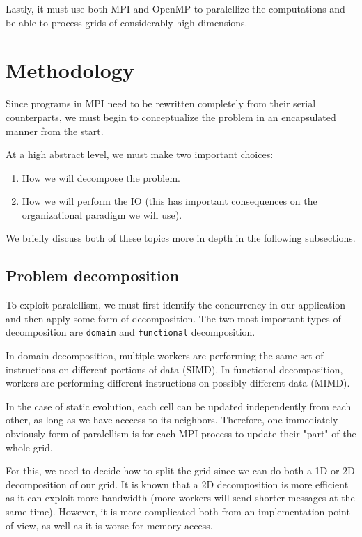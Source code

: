 \documentclass{report}
\begin{document}
Lastly, it must use both MPI\cite{mpi} and OpenMP\cite{omp} to paralellize 
the computations and be able to process grids of considerably high dimensions. 

\section{Methodology}

Since programs in MPI need to be rewritten completely from their serial 
counterparts, we must begin to conceptualize the problem in an encapsulated 
manner from the start.

At a high abstract level, we must make two important choices: 

\begin{enumerate}
    \item How we will decompose the problem. 
    \item How we will perform the IO (this has important consequences on the 
        organizational paradigm we will use).
\end{enumerate}

We briefly discuss both of these topics more in depth in the following subsections.

\subsection{Problem decomposition}

To exploit paralellism, we must first identify the concurrency in our 
application and then apply some form of decomposition. The two most important 
types of decomposition are \texttt{domain} and \texttt{functional} decomposition. 

In domain decomposition, multiple workers are performing the same set of 
instructions on different portions of data (SIMD). In functional 
decomposition, workers are performing different instructions on possibly 
different data (MIMD). 
 
In the case of static evolution, each cell can be updated independently from each 
other, as long as we have acccess to its neighbors. Therefore, one immediately 
obviously form of paralellism is for each MPI process to update their "part" 
of the whole grid. 

For this, we need to decide how to split the grid since we can do both a 1D or 
2D decomposition of our grid. It is known that a 2D decomposition is more 
efficient as it can exploit more bandwidth (more workers will send shorter messages 
at the same time). However, it is more complicated both from an implementation 
point of view, as well as it is worse for memory access. 
\end{document}
